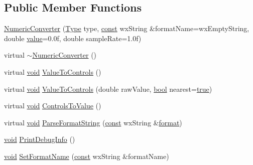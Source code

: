 \subsection*{Public Member Functions}
\begin{DoxyCompactItemize}
\item 
\hyperlink{class_numeric_converter_aee249a8517f59d2888906b0300ae94a5}{Numeric\+Converter} (\hyperlink{class_numeric_converter_a2005a4bd0c2a9614868772e37fb9e2fb}{Type} type, \hyperlink{getopt1_8c_a2c212835823e3c54a8ab6d95c652660e}{const} wx\+String \&format\+Name=wx\+Empty\+String, double \hyperlink{lib_2expat_8h_a4a30a13b813682e68c5b689b45c65971}{value}=0.\+0f, double sample\+Rate=1.\+0f)
\item 
virtual \hyperlink{class_numeric_converter_a2d29a979bb439de467f7055ad1b36734}{$\sim$\+Numeric\+Converter} ()
\item 
virtual \hyperlink{sound_8c_ae35f5844602719cf66324f4de2a658b3}{void} \hyperlink{class_numeric_converter_a2ff0c68d612273c8d19fc3841e6f2f2c}{Value\+To\+Controls} ()
\item 
virtual \hyperlink{sound_8c_ae35f5844602719cf66324f4de2a658b3}{void} \hyperlink{class_numeric_converter_abd4a81a1deda30b0c2e66d0292809e3a}{Value\+To\+Controls} (double raw\+Value, \hyperlink{mac_2config_2i386_2lib-src_2libsoxr_2soxr-config_8h_abb452686968e48b67397da5f97445f5b}{bool} nearest=\hyperlink{mac_2config_2i386_2lib-src_2libsoxr_2soxr-config_8h_a41f9c5fb8b08eb5dc3edce4dcb37fee7}{true})
\item 
virtual \hyperlink{sound_8c_ae35f5844602719cf66324f4de2a658b3}{void} \hyperlink{class_numeric_converter_a2686b9c69cf7c8a225f26af59cc89f59}{Controls\+To\+Value} ()
\item 
virtual \hyperlink{sound_8c_ae35f5844602719cf66324f4de2a658b3}{void} \hyperlink{class_numeric_converter_ab46d2e400350df44e6590b154cdc22c7}{Parse\+Format\+String} (\hyperlink{getopt1_8c_a2c212835823e3c54a8ab6d95c652660e}{const} wx\+String \&\hyperlink{_export_p_c_m_8cpp_a317afff57d87a89158c2b038d37b2b08}{format})
\item 
\hyperlink{sound_8c_ae35f5844602719cf66324f4de2a658b3}{void} \hyperlink{class_numeric_converter_a8b998cb4f0ba2b5e10c0e5f2721e71ea}{Print\+Debug\+Info} ()
\item 
\hyperlink{sound_8c_ae35f5844602719cf66324f4de2a658b3}{void} \hyperlink{class_numeric_converter_a440c2a7975cca819255d012317b198dc}{Set\+Format\+Name} (\hyperlink{getopt1_8c_a2c212835823e3c54a8ab6d95c652660e}{const} wx\+String \&format\+Name)
\item 

\end{DoxyCompactItemize}
